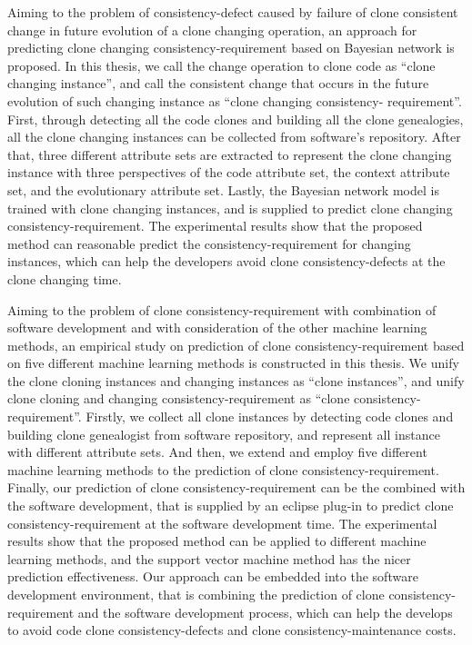 {%
Aiming to the problem of consistency-defect caused by failure of clone consistent change in future evolution of a clone changing operation,  an approach for predicting clone changing consistency-requirement based on Bayesian network is proposed. In this thesis, we call the change operation to clone code as ``clone changing instance'', and call the consistent change that occurs in the future evolution of such changing instance as ``clone changing consistency- requirement''. First, through detecting all the code clones and building all the clone genealogies, all the clone changing instances can be collected  from software's repository. After that, three different attribute sets are extracted to represent the clone changing instance with three perspectives of the code attribute set, the context attribute set, and the evolutionary attribute set. Lastly, the Bayesian network model is trained with clone changing instances, and  is supplied to predict clone changing consistency-requirement. The experimental results show that the proposed method can reasonable predict the consistency-requirement for changing instances, which can help the developers avoid clone consistency-defects at the clone changing time.


Aiming to the problem of clone consistency-requirement with combination of software development and with consideration of the other machine learning methods, an empirical study on prediction of clone consistency-requirement based on five different machine learning methods is constructed in this thesis. We unify the clone cloning instances and changing instances as ``clone instances'', and unify clone cloning and changing consistency-requirement as ``clone consistency-requirement''. Firstly, we collect all clone instances by detecting code clones and building clone genealogist from software repository, and represent all instance with different attribute sets. And then, we extend and employ five different machine learning methods to the prediction of clone consistency-requirement. Finally, our prediction of clone consistency-requirement can be the combined with the software development, that is supplied by an eclipse plug-in to predict clone consistency-requirement at the software development time. The experimental results show that the proposed method can be applied to different machine learning methods, and the support vector machine method has the nicer prediction effectiveness. Our approach can be embedded into the software development environment, that is combining the prediction of clone consistency-requirement and the software development process, which can help the develops to avoid code clone consistency-defects and clone consistency-maintenance costs. %

}
